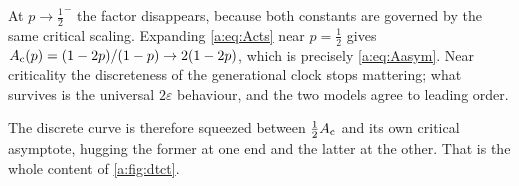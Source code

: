 At $p\to\tfrac12^-$ the factor disappears, because both constants are governed by
the same critical scaling. Expanding \cref{a:eq:Acts} near $p=\tfrac12$ gives
$A_{\mathrm{c}}(p) = (1-2p)/(1-p)\to2(1-2p)$, which is precisely \cref{a:eq:Aasym}. Near
criticality the discreteness of the generational clock stops mattering; what
survives is the universal $2\varepsilon$ behaviour, and the two models agree to
leading order.

The discrete curve is therefore squeezed between $\tfrac12A_{\mathrm{c}}$ and its own critical
asymptote, hugging the former at one end and the latter at the other. That is the
whole content of \cref{a:fig:dtct}.


